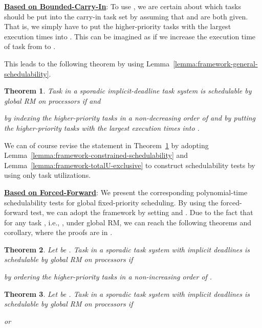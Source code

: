 \documentclass[10pt,conference]{IEEEtran}
\newcommand{\frameworkkq}[1]{}
\newtheorem{theorem}{Theorem}
\begin{document}
\noindent\underline{\bf Based on Bounded-Carry-In}:
To use \frameworkkq{}, we are certain about which tasks should be put
into the carry-in task set  by assuming that  and 
are both given. That is, we simply have to put the 
higher-priority tasks with the largest execution times into . This can be imagined as if we increase the execution time of
task  from  to .

This leads to the following theorem by using
Lemma~\ref{lemma:framework-general-schedulability}. 

\begin{theorem}
\label{thm:multiprocessor-GRM-M-1-carry-k2q}
Task  in a sporadic implicit-deadline task system is
schedulable by global RM on  processors if  and

by indexing the  higher-priority tasks in a non-decreasing order
of  and by putting the 
higher-priority tasks with the largest execution times into .
\end{theorem}

We can of course revise the statement in
Theorem~\ref{thm:multiprocessor-GRM-M-1-carry-k2q} by adopting
Lemma~\ref{lemma:framework-constrained-schedulability} and
Lemma~\ref{lemma:framework-totalU-exclusive} to construct
schedulability tests by using only task utilizations.

\noindent\underline{\bf Based on Forced-Forward}: 
We present the corresponding polynomial-time schedulability tests for
global fixed-priority scheduling. By using the forced-forward test,
we can adopt the \frameworkkq{} framework by setting
 and . Due to the fact
that  for any task , i.e., , under global RM, we can reach the following theorems and
corollary, where the proofs are in \cite{DBLP:journals/corr/abs-kRTA}.

 \begin{theorem}
  \label{thm:multiprocessor-grm-sporadic-k2q-tight}
Let  be .  
Task  in a sporadic task system with implicit deadlines  is schedulable by global RM on
 processors if

by ordering the  higher-priority tasks in a non-increasing order of .
\end{theorem}

\begin{theorem}
  \label{thm:multiprocessor-grm-sporadic-tight}
Let  be .  
Task  in a sporadic task system with implicit deadlines  is schedulable by global RM on
 processors if

or

\end{theorem}
\end{document}
